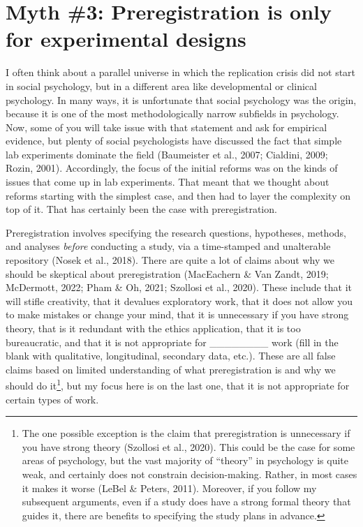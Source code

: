 \documentclass[authordate, empirical,issue]{jote-new-article}
\begin{document}
\section{Myth \#3: Preregistration is only for experimental designs}







I often think about a parallel universe in which the replication crisis did not start in social psychology, but in a different area like developmental or clinical psychology. In many ways, it is unfortunate that social psychology was the origin, because it is one of the most methodologically narrow subfields in psychology. Now, some of you will take issue with that statement and ask for empirical evidence, but plenty of social psychologists have discussed the fact that simple lab experiments dominate the field (Baumeister et al., 2007; Cialdini, 2009; Rozin, 2001). Accordingly, the focus of the initial reforms was on the kinds of issues that come up in lab experiments. That meant that we thought about reforms starting with the simplest case, and then had to layer the complexity on top of it. That has certainly been the case with preregistration.







Preregistration involves specifying the research questions, hypotheses, methods, and analyses \emph{before} conducting a study, via a time-stamped and unalterable repository (Nosek et al., 2018). There are quite a lot of claims about why we should be skeptical about preregistration (MacEachern \& Van Zandt, 2019; McDermott, 2022; Pham \& Oh, 2021; Szollosi et al., 2020). These include that it will stifle creativity, that it devalues exploratory work, that it does not allow you to make mistakes or change your mind, that it is unnecessary if you have strong theory, that is it redundant with the ethics application, that it is too bureaucratic, and that it is not appropriate for \_\_\_\_\_\_\_\_ work (fill in the blank with qualitative, longitudinal, secondary data, etc.). These are all false claims based on limited understanding of what preregistration is and why we should do it\footnote{ The one possible exception is the claim that preregistration is unnecessary if you have strong theory (Szollosi et al.,
2020). This could be the case for some areas of psychology, but the vast majority of “theory” in psychology is quite weak, and certainly does not constrain decision-making. Rather, in most cases it makes it worse (LeBel \& Peters, 2011). Moreover, if you follow my subsequent arguments, even if a study does have a strong formal theory that guides it, there are benefits to specifying the study plans in advance. }, but my focus here is on the last one, that it is not appropriate for certain types of work.
\end{document}
